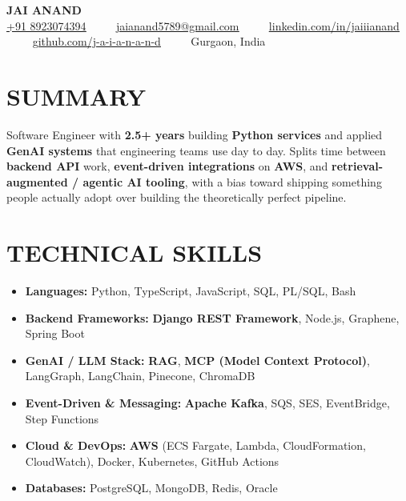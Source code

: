 \documentclass[letterpaper,10pt]{article}
\renewcommand{\normalsize}{%
  \fontsize{10.1}{12.25}\selectfont
}
\begin{document}
\begin{center}
    {\Huge \textbf{JAI ANAND}} \\ \vspace{4pt}
    \small
    \href{tel:+918923074394}{\underline{+91 8923074394}} ~~\textbullet~~ 
    \href{mailto:jaianand5789@gmail.com}{\underline{jaianand5789@gmail.com}} ~~\textbullet~~ 
    \href{https://linkedin.com/in/jaiiianand/}{\underline{linkedin.com/in/jaiiianand}} ~~\textbullet~~ 
    \href{https://github.com/j-a-i-a-n-a-n-d}{\underline{github.com/j-a-i-a-n-a-n-d}} ~~\textbullet~~
    Gurgaon, India
\end{center}

\section{SUMMARY}
Software Engineer with \textbf{2.5+ years} building \textbf{Python services} and applied \textbf{GenAI systems} that engineering teams use day to day. Splits time between \textbf{backend API} work, \textbf{event-driven integrations} on \textbf{AWS}, and \textbf{retrieval-augmented / agentic AI tooling}, with a bias toward shipping something people actually adopt over building the theoretically perfect pipeline.

\section{TECHNICAL SKILLS}
  \begin{itemize}[leftmargin=0.0in, label={}, itemsep=1pt, parsep=0pt, topsep=0pt]
    \item \normalsize{
     \textbf{\normalsize Languages:}{ Python, TypeScript, JavaScript, SQL, PL/SQL, Bash}
    }
    \item \normalsize{
     \textbf{\normalsize Backend Frameworks:}{ \textbf{Django REST Framework}, Node.js, Graphene, Spring Boot}
    }
    \item \normalsize{
     \textbf{\normalsize GenAI / LLM Stack:}{ \textbf{RAG}, \textbf{MCP (Model Context Protocol)}, LangGraph, LangChain, Pinecone, ChromaDB}
    }
    \item \normalsize{
     \textbf{\normalsize Event-Driven \& Messaging:}{ \textbf{Apache Kafka}, SQS, SES, EventBridge, Step Functions}
    }
    \item \normalsize{
     \textbf{\normalsize Cloud \& DevOps:}{ \textbf{AWS} (ECS Fargate, Lambda, CloudFormation, CloudWatch), Docker, Kubernetes, GitHub Actions}
    }
    \item \normalsize{
     \textbf{\normalsize Databases:}{ PostgreSQL, MongoDB, Redis, Oracle}
    }
  \end{itemize}
\end{document}
